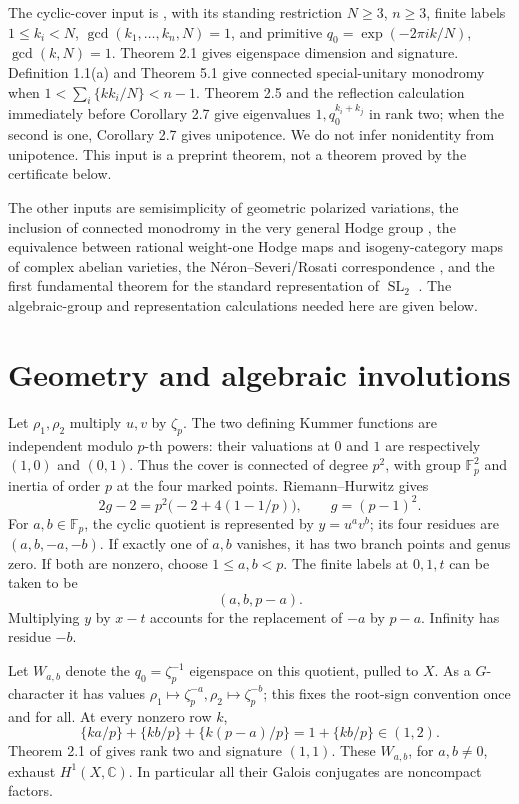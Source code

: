 \documentclass[11pt]{article}
\theoremstyle{remark}
\newcommand{\F}{\mathbb F}
\newcommand{\C}{\mathbb C}
\newcommand{\SL}{\operatorname{SL}}
\begin{document}
The cyclic-cover input is \cite{MN}, with its standing restriction
\(N\geq3\), \(n\geq3\), finite labels \(1\leq k_i<N\),
\(\gcd(k_1,\ldots,k_n,N)=1\), and primitive
\(q_0=\exp(-2\pi i k/N)\), \(\gcd(k,N)=1\).
Theorem 2.1 gives eigenspace dimension and signature.  Definition 1.1(a)
and Theorem 5.1 give connected special-unitary monodromy when
\(1<\sum_i\{kk_i/N\}<n-1\).
Theorem 2.5 and the reflection calculation immediately before Corollary
2.7 give eigenvalues \(1,q_0^{k_i+k_j}\) in rank two; when the second is
one, Corollary 2.7 gives unipotence.  We do not infer nonidentity from
unipotence.  This input is a preprint theorem, not a theorem proved by
the certificate below.

The other inputs are semisimplicity of geometric polarized variations,
the inclusion of connected monodromy in the very general Hodge group
\cite{Deligne,Andre}, the equivalence between rational weight-one Hodge
maps and isogeny-category maps of complex abelian varieties, the
N\'eron--Severi/Rosati correspondence \cite{BL}, and the first fundamental
theorem for the standard representation of \(\SL_2\) \cite{Weyl}.
The algebraic-group and representation calculations needed here are
given below.

\section{Geometry and algebraic involutions}
Let \(\rho_1,\rho_2\) multiply \(u,v\) by \(\zeta_p\).
The two defining Kummer functions are independent modulo \(p\)-th
powers: their valuations at \(0\) and \(1\) are respectively \((1,0)\)
and \((0,1)\).  Thus the cover is connected of degree \(p^2\), with
group \(\F_p^2\) and inertia of order \(p\) at the four marked points.
Riemann--Hurwitz gives
\[
 2g-2=p^2\bigl(-2+4(1-1/p)\bigr),\qquad g=(p-1)^2.
\]
For \(a,b\in\F_p\), the cyclic quotient is represented by
\(y=u^a v^b\); its four residues are \((a,b,-a,-b)\).
If exactly one of \(a,b\) vanishes, it has two branch points and genus
zero.  If both are nonzero, choose \(1\leq a,b<p\).
The finite labels at \(0,1,t\) can be taken to be
\begin{equation}\label{eq:finite-labels}
 (a,b,p-a).
\end{equation}
Multiplying \(y\) by \(x-t\) accounts for the replacement of \(-a\)
by \(p-a\).  Infinity has residue \(-b\).

Let \(W_{a,b}\) denote the \(q_0=\zeta_p^{-1}\) eigenspace on this
quotient, pulled to \(X\).  As a \(G\)-character it has values
\(\rho_1\mapsto\zeta_p^{-a},\rho_2\mapsto\zeta_p^{-b}\); this fixes the
root-sign convention once and for all.  At every nonzero row \(k\),
\begin{equation}\label{eq:good-match}
 \{ka/p\}+\{kb/p\}+\{k(p-a)/p\}=1+\{kb/p\}\in(1,2).
\end{equation}
Theorem 2.1 of \cite{MN} gives rank two and signature \((1,1)\).
These \(W_{a,b}\), for \(a,b\neq0\), exhaust \(H^1(X,\C)\).
In particular all their Galois conjugates are noncompact factors.
\end{document}

